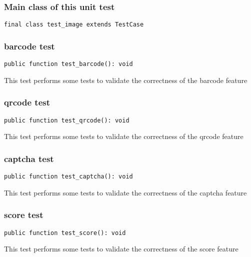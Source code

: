 \documentclass[a4paper]{article}
\begin{document}
\subsubsection{Main class of this unit test}

\begin{lstlisting}
final class test_image extends TestCase
\end{lstlisting}

\hypertarget{toc248}{}
\subsubsection{barcode test}

\begin{lstlisting}
public function test_barcode(): void
\end{lstlisting}

This test performs some tests to validate the correctness
of the barcode feature

\hypertarget{toc249}{}
\subsubsection{qrcode test}

\begin{lstlisting}
public function test_qrcode(): void
\end{lstlisting}

This test performs some tests to validate the correctness
of the qrcode feature

\hypertarget{toc250}{}
\subsubsection{captcha test}

\begin{lstlisting}
public function test_captcha(): void
\end{lstlisting}

This test performs some tests to validate the correctness
of the captcha feature

\hypertarget{toc251}{}
\subsubsection{score test}

\begin{lstlisting}
public function test_score(): void
\end{lstlisting}

This test performs some tests to validate the correctness
of the score feature
\end{document}
